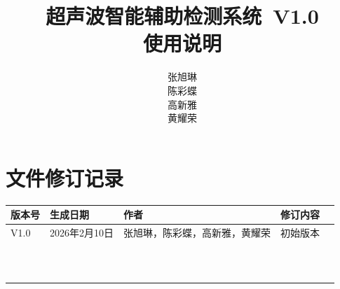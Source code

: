 \documentclass[12pt]{article}
\newcommand{\xiaoerhao}{\fontsize{18pt}{\baselineskip}\selectfont} %
\newcommand{\SoftwareName}{超声波智能辅助检测系统}
\newcommand{\Version}{V1.0}
\begin{document}
	\title{\xiaoerhao\textbf{{\Huge \SoftwareName~\Version }\\
			使用说明
	}} 
	\author{ 张旭琳\\陈彩蝶\\高新雅\\黄耀荣 }
	\date{}
	\maketitle
	\newpage
	\tableofcontents
	
	\newpage
	\section*{文件修订记录}
	
	\renewcommand{\arraystretch}{1.5} %
	
	\begin{center}
		\begin{tabular}{ | m{1.5cm}<{\centering}|m{4cm}<{\centering} | m{8.5cm}<{\centering} | c |m{2.5cm}<{\centering} |}
			\hline
			版本号 & 生成日期 & 作者 & 修订内容 \\ %
			\hline
			\Version & 2026年2月10日 & 
张旭琳，陈彩蝶，高新雅，黄耀荣 & 初始版本 \\ %
			\hline
			&  &  &  \\ %
			\hline
			&  &  &  \\ %
			\hline
			&  &  &  \\ %
			\hline
			&  &  &  \\ %
			\hline
			&  &  &  \\ %
			\hline
			&  &  &  \\ %
			\hline
			&  &  &  \\ %
			\hline
			&  &  &  \\ %
			\hline
			&  &  &  \\ %
			\hline
			&  &  &  \\ %
			\hline
			&  &  &  \\ %
			\hline
		\end{tabular}
	\end{center}
	
	
	\newpage
	
	\newpage
	
	\newpage
	
	
\end{document}

